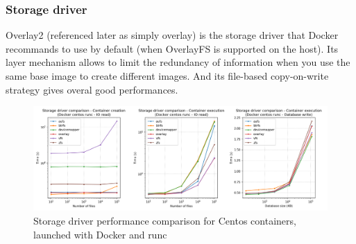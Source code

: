 \subsubsection{Storage driver}
Overlay2 (referenced later as simply overlay) is the storage driver that Docker recommands to use by default (when OverlayFS is supported on the host).  Its layer mechanism allows to limit the redundancy of information when you use the same base image to create different images.  And its file-based copy-on-write strategy gives overal good performances.

\begin{figure}[h!]
  \begin{center}
    \includegraphics[width=\linewidth]{images/question-1-storage-driver.png}
    \caption{Storage driver performance comparison for Centos containers, launched with Docker and runc}
    \label{fig:q1:storage-driver}
  \end{center}
\end{figure}

